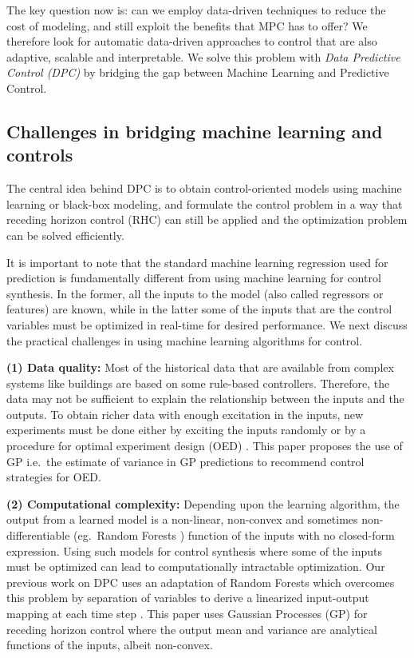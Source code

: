 The key question now is: can we employ data-driven techniques to reduce the cost of modeling, and still exploit the benefits that MPC has to offer?
We therefore look for automatic data-driven approaches to control that are also adaptive, scalable and interpretable.
We solve this problem with \textit{Data Predictive Control (DPC)} by bridging the gap between Machine Learning and Predictive Control.


\subsection{Challenges in bridging machine learning and controls}
\label{SS:practical_challenges}

The central idea behind DPC is to obtain control-oriented models using machine learning or black-box modeling, and formulate the control problem in a way that receding horizon control (RHC) can still be applied and the optimization problem can be solved efficiently.

It is important to note that the standard machine learning regression used for prediction is fundamentally different from using machine learning for control synthesis. In the former, all the inputs to the model (also called regressors or features) are known, while in the latter some of the inputs that are the control variables must be optimized in real-time for desired performance. 
We next discuss the practical challenges in using machine learning algorithms for control.

\noindent \textbf{(1) Data quality:} Most of the historical data that are available from complex systems like buildings are based on some rule-based controllers. Therefore, the data may not be sufficient to explain the relationship between the inputs and the outputs. To obtain richer data with enough excitation in the inputs, new experiments must be done either by exciting the inputs randomly or by a procedure for optimal experiment design (OED) \cite{Emery1998,Fedorov2010}. This paper proposes the use of GP i.e.~the estimate of variance in GP predictions to recommend control strategies for OED.

\noindent \textbf{(2) Computational complexity:} Depending upon the learning algorithm, the output from a learned model is a non-linear, non-convex and sometimes non-differentiable (eg.~Random Forests \cite{Friedman2001}) function of the inputs with no closed-form expression. Using such models for control synthesis where some of the inputs must be optimized can lead to computationally intractable optimization. Our previous work on DPC uses an adaptation of Random Forests which overcomes this problem by separation of variables to derive a linearized input-output mapping at each time step \cite{JainACC2017,JainCDC2017}.
This paper uses Gaussian Processes (GP) for receding horizon control where the output mean and variance are analytical functions of the inputs, albeit non-convex.


